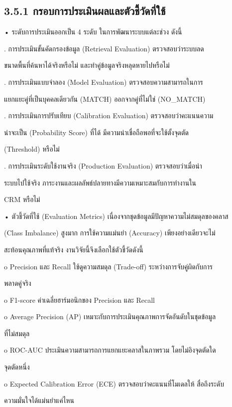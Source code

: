 \documentclass[12pt,a4paper]{report}
\begin{document}
\subsection*{3.5.1 กรอบการประเมินผลและตัวชี้วัดที่ใช้}
\noindent • ระดับการประเมินออกเป็น 4 ระดับ ในการพัฒนาระบบแต่ละช่วง ดังนี้\par
{}. การประเมินขั้นคัดกรองข้อมูล (Retrieval Evaluation) ตรวจสอบว่าระบบลด\par
ขนาดพื้นที่ค้นหาได้จริงหรือไม่ และทำคู่ข้อมูลจริงหลุดหายไปหรือไม่\par
{}. การประเมินแบบจำลอง (Model Evaluation) ตรวจสอบความสามารถในการ\par
แยกแยะคู่ที่เป็นบุคคลเดียวกัน (MATCH) ออกจากคู่ที่ไม่ใช่ (NO\_MATCH)\par
{}. การประเมินการปรับเทียบ (Calibration Evaluation) ตรวจสอบว่าคะแนนความ\par
น่าจะเป็น (Probability Score) ที่ได้ มีความน่าเชื่อถือพอที่จะใช้ตั้งจุดตัด\par
(Threshold) หรือไม่\par
{}. การประเมินระดับใช้งานจริง (Production Evaluation) ตรวจสอบว่าเมื่อนำ\par
ระบบไปใช้จริง ภาระงานและผลลัพธ์ปลายทางมีความเหมาะสมกับการทำงานใน\par
CRM หรือไม่\par
\noindent • ตัวชี้วัดที่ใช้ (Evaluation Metrics) เนื่องจากชุดข้อมูลมีปัญหาความไม่สมดุลของคลาส\par
(Class Imbalance) สูงมาก การใช้ความแม่นยำ (Accuracy) เพียงอย่างเดียวจะไม่\par
สะท้อนคุณภาพที่แท้จริง งานวิจัยนี้จึงเลือกใช้ตัวชี้วัดดังนี้\par
o Precision และ Recall ใช้ดูความสมดุล (Trade-off) ระหว่างการจับคู่ผิดกับการ\par
พลาดคู่จริง\par
o F1-score ค่าเฉลี่ยฮาร์มอนิกของ Precision และ Recall\par
o Average Precision (AP) เหมาะกับการประเมินคุณภาพการจัดอันดับในชุดข้อมูล\par
ที่ไม่สมดุล\par
\clearpage
o ROC-AUC ประเมินความสามารถการแยกแยะคลาสในภาพรวม โดยไม่อิงจุดตัดใด\par
จุดตัดหนึ่ง\par
o Expected Calibration Error (ECE) ตรวจสอบว่าคะแนนที่โมเดลให้ สื่อถึงระดับ\par
ความมั่นใจได้แม่นยำแค่ไหน\par
\end{document}
